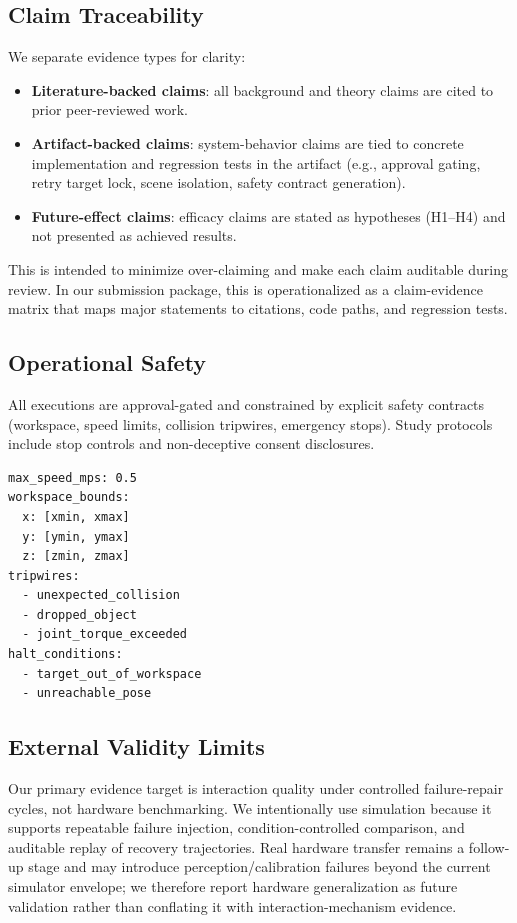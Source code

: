 \documentclass[sigconf,review,anonymous]{acmart}
\begin{document}
\subsection{Claim Traceability}
We separate evidence types for clarity:
\begin{itemize}
  \item \textbf{Literature-backed claims}: all background and theory claims are cited to prior peer-reviewed work.
  \item \textbf{Artifact-backed claims}: system-behavior claims are tied to concrete implementation and regression tests in the artifact (e.g., approval gating, retry target lock, scene isolation, safety contract generation).
  \item \textbf{Future-effect claims}: efficacy claims are stated as hypotheses (H1--H4) and not presented as achieved results.
\end{itemize}
This is intended to minimize over-claiming and make each claim auditable during review.
In our submission package, this is operationalized as a claim-evidence matrix that maps major statements to citations, code paths, and regression tests.

\subsection{Operational Safety}
All executions are approval-gated and constrained by explicit safety contracts (workspace, speed limits, collision tripwires, emergency stops). Study protocols include stop controls and non-deceptive consent disclosures.
\begin{verbatim}
max_speed_mps: 0.5
workspace_bounds:
  x: [xmin, xmax]
  y: [ymin, ymax]
  z: [zmin, zmax]
tripwires:
  - unexpected_collision
  - dropped_object
  - joint_torque_exceeded
halt_conditions:
  - target_out_of_workspace
  - unreachable_pose
\end{verbatim}

\subsection{External Validity Limits}
Our primary evidence target is interaction quality under controlled failure-repair cycles, not hardware benchmarking. We intentionally use simulation because it supports repeatable failure injection, condition-controlled comparison, and auditable replay of recovery trajectories. Real hardware transfer remains a follow-up stage and may introduce perception/calibration failures beyond the current simulator envelope; we therefore report hardware generalization as future validation rather than conflating it with interaction-mechanism evidence.
\end{document}
